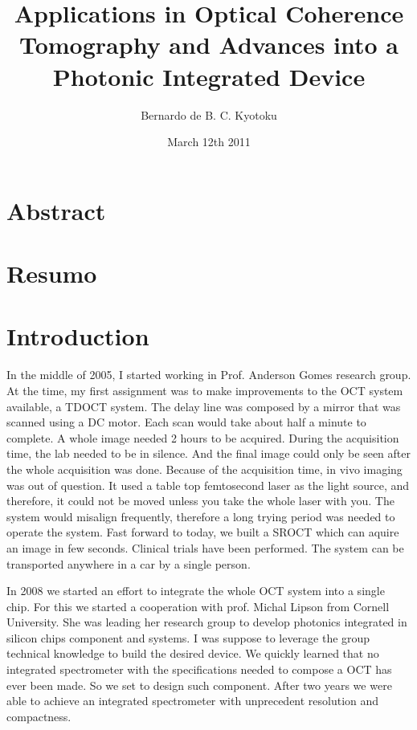 \documentclass[12pt,twoside,english]{book}
\author{Bernardo de B. C. Kyotoku}
\title{Applications in Optical Coherence Tomography and Advances into a Photonic Integrated Device}
\date{March 12th 2011}
\renewcommand{\~}{\perispomeni}%
\numberwithin{equation}{section}
\numberwithin{figure}{section}
\begin{document}
\maketitle
\chapter*{Abstract}

\chapter*{Resumo}

\tableofcontents{}

\chapter*{Introduction}
\thispagestyle{myheadings}

In the middle of 2005, I started working in Prof. Anderson Gomes research group. At the time, my first assignment was to make improvements to the \gls{OCT} system available, a \gls{TDOCT} system. The delay line was composed by a mirror that was scanned using a DC motor. Each scan would take about half a minute to complete. A whole image needed 2 hours to be acquired. During the acquisition time, the lab needed to be in silence. And the final image could only be seen after the whole acquisition was done. Because of the acquisition time, in vivo imaging was out of question. It used a table top femtosecond laser as the light source, and therefore, it could not be moved unless you take the whole laser with you. The system would misalign frequently, therefore a long trying period was needed to operate the system. Fast forward to today, we built a \gls{SROCT} which can aquire an image in few seconds. Clinical trials have been performed. The system can be transported anywhere in a car by a single person. 

In 2008 we started an effort to integrate the whole \gls{OCT} system into a single chip. For this we started a cooperation with prof. Michal Lipson from Cornell University. She was leading her research group to develop photonics integrated in silicon chips component and systems. I was suppose to leverage the group technical knowledge to build the desired device. We quickly learned that no integrated spectrometer with the specifications needed to compose a OCT has ever been made. So we set to design such component. After two years we were able to achieve an integrated spectrometer with unprecedent resolution and compactness.
\end{document}
